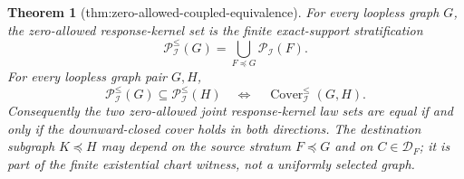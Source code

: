 \documentclass{article}
\newtheorem{theorem}{Theorem}
\begin{document}
\begin{theorem}[thm:zero-allowed-coupled-equivalence]\label{thm:zero-allowed-coupled-equivalence}
For every loopless graph \(G\), the zero-allowed response-kernel set is the finite exact-support stratification
\[
\mathcal P^{\le}_{\mathcal I}(G)=\bigcup_{F\preceq G}\mathcal P_{\mathcal I}(F).
\]
For every loopless graph pair \(G,H\),
\[
\mathcal P^{\le}_{\mathcal I}(G)\subseteq\mathcal P^{\le}_{\mathcal I}(H)
\quad\Longleftrightarrow\quad
\operatorname{Cover}^{\le}_{\mathcal I}(G,H).
\]
Consequently the two zero-allowed joint response-kernel law sets are equal if and only if the downward-closed cover holds in both directions. The destination subgraph \(K\preceq H\) may depend on the source stratum \(F\preceq G\) and on \(C\in\mathcal D_F\); it is part of the finite existential chart witness, not a uniformly selected graph.
\end{theorem}
\end{document}
